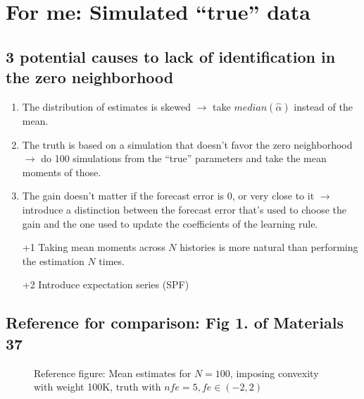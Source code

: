 \documentclass[11pt]{article}
\def \myFigPath {../../figures/}
\renewcommand{\[}{\begin{equation}}
\renewcommand{\]}{\end{equation}}
\def\mySmallerFigScale{0.18}
\def\myTinyFigScale{0.16}
\newcommand\blankpage{%
    \null
    \thispagestyle{empty}%
    \addtocounter{page}{-1}%
    \newpage}
\begin{document}
\afterpage{\blankpage}

\newpage

\clearpage

\section{For me: Simulated ``true'' data}
\subsection*{3 potential causes to lack of identification in the zero neighborhood}
\begin{enumerate}
\item The distribution of estimates is skewed $\rightarrow$ take $median(\hat{\alpha})$ instead of the mean.
\item The truth is based on a simulation that doesn't favor the zero neighborhood $\rightarrow$ do 100 simulations from the ``true'' parameters and take the mean moments of those.
\item The gain doesn't matter if the forecast error is 0, or very close to it $\rightarrow$ introduce a distinction between the forecast error that's used to choose the gain and the one used to update the coefficients of the learning rule.
\item[+1] Taking mean moments across $N$ histories is more natural than performing the estimation $N$ times.
\item[+2] Introduce expectation series (SPF)
\end{enumerate}

\subsection*{Reference for comparison: Fig 1. of Materials 37}

\begin{figure}[h!]
\hfill
{}
\caption{Reference figure: Mean estimates for $N=100$, imposing convexity with weight 100K, truth with $nfe=5, fe \in(-2,2)$}
\end{figure}
\end{document}
